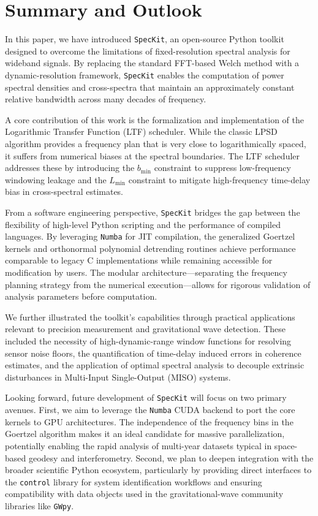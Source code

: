\documentclass[final, 5p, times, twocolumn, number, sort&compress]{elsarticle}
\newcommand{\speckit}{\texttt{SpecKit}}
\begin{document}
\section{Summary and Outlook}
\label{sec:summary-and-outlook}

In this paper, we have introduced \speckit{}, an open-source Python toolkit designed to overcome the limitations of fixed-resolution spectral analysis for wideband signals. By replacing the standard FFT-based Welch method with a dynamic-resolution framework, \speckit{} enables the computation of power spectral densities and cross-spectra that maintain an approximately constant relative bandwidth across many decades of frequency.

A core contribution of this work is the formalization and implementation of the Logarithmic Transfer Function (LTF) scheduler. While the classic LPSD algorithm provides a frequency plan that is very close to logarithmically spaced, it suffers from numerical biases at the spectral boundaries. The LTF scheduler addresses these by introducing the $b_{\min}$ constraint to suppress low-frequency windowing leakage and the $L_{\min}$ constraint to mitigate high-frequency time-delay bias in cross-spectral estimates.

From a software engineering perspective, \speckit{} bridges the gap between the flexibility of high-level Python scripting and the performance of compiled languages. By leveraging \texttt{Numba} for JIT compilation, the generalized Goertzel kernels and orthonormal polynomial detrending routines achieve performance comparable to legacy C implementations while remaining accessible for modification by users. The modular architecture---separating the frequency planning strategy from the numerical execution---allows for rigorous validation of analysis parameters before computation.

We further illustrated the toolkit's capabilities through practical applications relevant to precision measurement and gravitational wave detection. These included the necessity of high-dynamic-range window functions for resolving sensor noise floors, the quantification of time-delay induced errors in coherence estimates, and the application of optimal spectral analysis to decouple extrinsic disturbances in Multi-Input Single-Output (MISO) systems.

Looking forward, future development of \speckit{} will focus on two primary avenues. First, we aim to leverage the \texttt{Numba} CUDA backend to port the core kernels to GPU architectures. The independence of the frequency bins in the Goertzel algorithm makes it an ideal candidate for massive parallelization, potentially enabling the rapid analysis of multi-year datasets typical in space-based geodesy and interferometry. Second, we plan to deepen integration with the broader scientific Python ecosystem, particularly by providing direct interfaces to the \texttt{control} library for system identification workflows and ensuring compatibility with data objects used in the gravitational-wave community libraries like \texttt{GWpy}.
\end{document}
